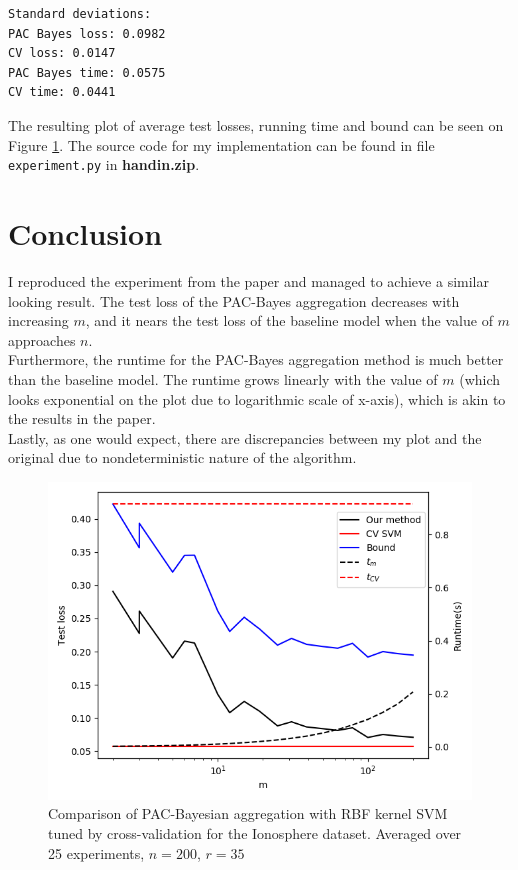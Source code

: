 \documentclass[a4paper]{article}
\begin{document}
\begin{verbatim}
Standard deviations:
PAC Bayes loss: 0.0982
CV loss: 0.0147
PAC Bayes time: 0.0575
CV time: 0.0441
\end{verbatim}
The resulting plot of average test losses,
running time and bound can be seen on Figure \ref{plt1}. The source code for my
implementation can be found in file \texttt{experiment.py} in
\textbf{handin.zip}.

\section{Conclusion}
I reproduced the experiment from the paper and managed to achieve a similar
looking result. The test loss of the PAC-Bayes aggregation decreases with
increasing $m$, and it nears the test loss of the baseline model when the value
of $m$ approaches $n$. \\
Furthermore, the runtime for the PAC-Bayes aggregation method
is much better than the baseline model. The runtime grows
linearly with the value of $m$ (which looks exponential on the plot due to
logarithmic scale of x-axis), which is akin to the results in the paper. \\
Lastly, as one would expect, there are discrepancies between my plot and the
original due to nondeterministic nature of the algorithm.

\begin{figure}
  \centering
  \includegraphics[width=\textwidth]{code/plt_avg25}
  \caption{Comparison of PAC-Bayesian aggregation with RBF kernel SVM
    tuned by cross-validation for the Ionosphere dataset. Averaged over 25 experiments, $n=200$, $r=35$}
  \label{plt1}
\end{figure}
\end{document}
